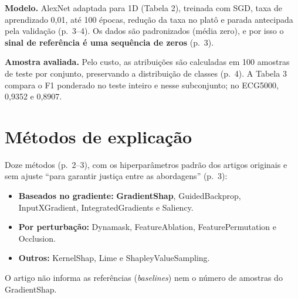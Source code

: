 \documentclass[11pt,a4paper]{article}
\begin{document}
\textbf{Modelo.} AlexNet adaptada para 1D (Tabela 2), treinada com SGD, taxa de aprendizado 0,01, até 100 épocas, redução da taxa no platô e parada antecipada pela validação (p.~3--4). Os dados são padronizados (média zero), e por isso o \textbf{sinal de referência é uma sequência de zeros} (p.~3).

\textbf{Amostra avaliada.} Pelo custo, as atribuições são calculadas em 100 amostras de teste por conjunto, preservando a distribuição de classes (p.~4). A Tabela 3 compara o F1 ponderado no teste inteiro e nesse subconjunto; no ECG5000, 0,9352 e 0,8907.

\section{Métodos de explicação}
Doze métodos (p.~2--3), com os hiperparâmetros padrão dos artigos originais e sem ajuste ``para garantir justiça entre as abordagens'' (p.~3):
\begin{itemize}
\item \textbf{Baseados no gradiente:} \textbf{GradientShap}, GuidedBackprop, InputXGradient, IntegratedGradients e Saliency.
\item \textbf{Por perturbação:} Dynamask, FeatureAblation, FeaturePermutation e Occlusion.
\item \textbf{Outros:} KernelShap, Lime e ShapleyValueSampling.
\end{itemize}
O artigo não informa as referências (\textit{baselines}) nem o número de amostras do GradientShap.
\end{document}
